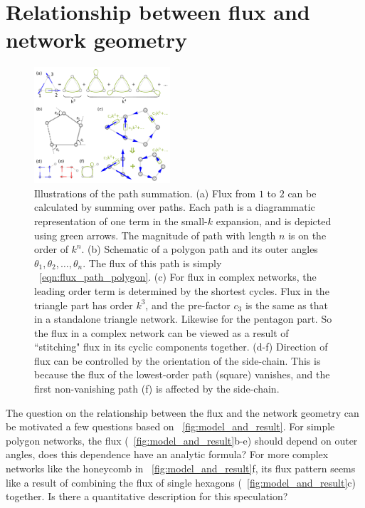\documentclass[
 preprint,
 preprintnumbers,
 amsmath,amssymb,
 aps,
 pre,
 longbibliography,
 10pt, twocolumn
]{revtex4-1}
\begin{document}
\section{Relationship between flux and network geometry} \label{sec:path}
\begin{figure}[ht]
	\centering
	\includegraphics[width=0.45\textwidth]{4_path_sum.pdf}
    \caption{Illustrations of the path summation. 
    (a) Flux from $1$ to $2$ can be calculated by summing over paths. Each path is a diagrammatic representation of one term in the small-$k$ expansion, and is depicted using green arrows. The magnitude of path with length $n$ is on the order of $k^n$. 
    (b) Schematic of a polygon path and its outer angles $\theta_1,\theta_2,\dots,\theta_n$. The flux of this path is simply \eqnname~\eqref{eqn:flux_path_polygon}. 
    (c) For flux in complex networks, the leading order term is determined by the shortest cycles. Flux in the triangle part has order $k^3$, and the pre-factor $c_3$ is the same as that in a standalone triangle network. Likewise for the pentagon part. So the flux in a complex network can be viewed as a result of ``stitching" flux in its cyclic components together.
    (d-f) Direction of flux can be controlled by the orientation of the side-chain. This is because the flux of the lowest-order path (square) vanishes, and the first non-vanishing path (f) is affected by the side-chain.
    }
    \label{fig:path_sum}
\end{figure}

The question on the relationship between the flux and the network geometry can be motivated a few questions based on \figurename~\ref{fig:model_and_result}.
For simple polygon networks, the flux (\figurename~\ref{fig:model_and_result}b-e) should depend on outer angles, does this dependence have an analytic formula?
For more complex networks like the honeycomb in \figurename~\ref{fig:model_and_result}f, its flux pattern seems like a result of combining the flux of single hexagons (\figurename~\ref{fig:model_and_result}c) together. Is there a quantitative description for this speculation?
\end{document}
